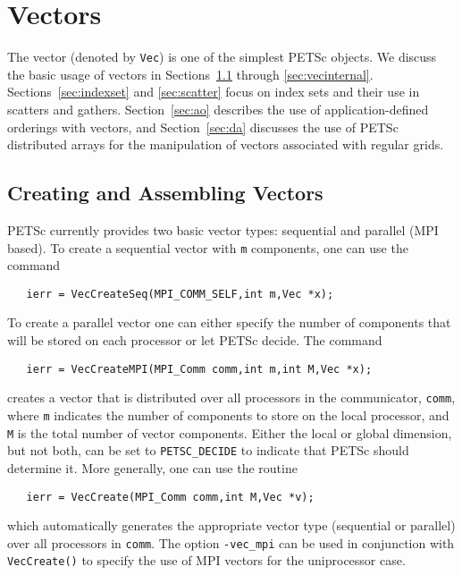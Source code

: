 %
%

\chapter{Vectors} 
\label{chapter:vectors}

The vector (denoted by {\tt Vec}) is one of the simplest PETSc objects.
We discuss the basic usage of vectors in Sections~\ref{sec:veccreate}
through \ref{sec:vecinternal}.  Sections~\ref{sec:indexset} and
\ref{sec:scatter} focus on index sets and their use in scatters and
gathers.  Section~\ref{sec:ao} describes the use of
application-defined orderings with vectors, and Section~\ref{sec:da}
discusses the use of PETSc distributed arrays for the manipulation of
vectors associated with regular grids.

\section{Creating and Assembling Vectors}
\label{sec:veccreate}

PETSc currently provides two basic vector types: sequential and parallel
(MPI based). To create a sequential vector with {\tt m} components,
one can
use the command  
\begin{verbatim}
   ierr = VecCreateSeq(MPI_COMM_SELF,int m,Vec *x);
\end{verbatim}
To create a parallel vector one can either specify the number of 
components that will be stored on each processor or let PETSc decide. 
The command 
\begin{verbatim}
   ierr = VecCreateMPI(MPI_Comm comm,int m,int M,Vec *x);
\end{verbatim}
creates a vector that is distributed over all processors in the communicator,
{\tt comm}, where {\tt m} indicates the number 
of components to store on the local processor, and {\tt M} is the 
total number of vector components.  Either the local or global 
dimension, but not both, can be set to {\tt PETSC\_DECIDE} to 
 indicate that PETSc should determine it.
More generally, one can use the routine 
\begin{verbatim}
   ierr = VecCreate(MPI_Comm comm,int M,Vec *v);
\end{verbatim}
which automatically generates the appropriate vector type 
(sequential or parallel) over all processors in {\tt comm}.
The option {\tt -vec\_mpi} can be used in conjunction with 
{\tt VecCreate()} to specify the use of MPI
vectors for the uniprocessor case.

